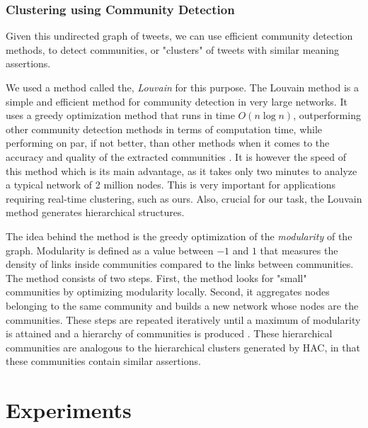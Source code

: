 \documentclass[letterpaper]{article}
\begin{document}
\subsubsection{Clustering using Community Detection}
Given this undirected graph of tweets, we can use efficient community detection methods, to detect communities, or "clusters" of tweets with similar meaning assertions.

We used a method called the, \emph{Louvain} \cite{de2011generalized} for this purpose. The Louvain method is a simple and efficient method for community detection in very large networks. It uses a greedy optimization method that runs in time $O(n\log{}n)$, outperforming other community detection methods in terms of computation time, while  performing on par, if not better, than other methods when it comes to the accuracy and quality of the extracted communities \cite{aynaud2013multilevel}. It is however the speed of this method which is its main advantage, as it takes only two minutes to analyze a typical network of 2 million nodes. This is very important for applications requiring real-time clustering, such as ours. Also, crucial for our task, the Louvain method generates hierarchical structures.

The idea behind the method is the greedy optimization of the \emph{modularity} of the graph. Modularity is defined as a value between $-1$ and $1$ that measures the density of links inside communities compared to the links between communities. The method consists of two steps. First, the method looks for "small" communities by optimizing modularity locally. Second, it aggregates nodes belonging to the same community and builds a new network whose nodes are the communities. These steps are repeated iteratively until a maximum of modularity is attained and a hierarchy of communities is produced \cite{de2011generalized}. These hierarchical communities are analogous to the hierarchical clusters generated by HAC, in that these communities contain similar assertions.



\section{Experiments}
\end{document}
